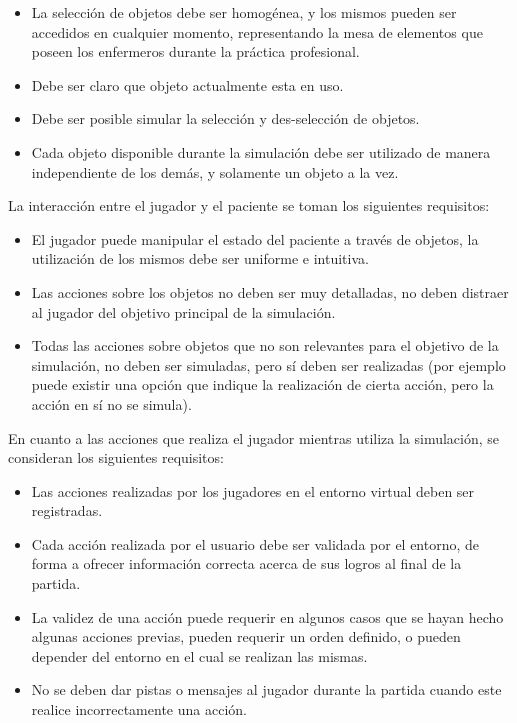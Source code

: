 \begin{itemize}
\item La selección de objetos debe ser homogénea, y los mismos pueden ser
    accedidos en cualquier momento, representando la mesa de elementos que
    poseen los enfermeros durante la práctica profesional.
\item Debe ser claro que objeto actualmente esta en uso.
\item Debe ser posible simular la selección y des-selección de objetos.
\item Cada objeto disponible durante la simulación debe ser utilizado de
    manera independiente de los demás, y solamente un objeto a la vez.
\end{itemize}

La interacción entre el jugador y el paciente se toman los siguientes
requisitos:

\begin{itemize}
\item El jugador puede manipular el estado del paciente a través de objetos, la
    utilización de los mismos debe ser uniforme e intuitiva.
\item Las acciones sobre los objetos no deben ser muy detalladas, no deben
    distraer al jugador del objetivo principal de la simulación.
\item Todas las acciones sobre objetos que no son relevantes para el objetivo de
    la simulación, no deben ser simuladas, pero sí deben ser realizadas (por
    ejemplo puede existir una opción que indique la realización de cierta
    acción, pero la acción en sí no se simula).
\end{itemize}

En cuanto a las acciones que realiza el jugador mientras utiliza la simulación,
se consideran los siguientes requisitos:

\begin{itemize}
\item Las acciones realizadas por los jugadores en el entorno virtual deben ser
    registradas.
\item Cada acción realizada por el usuario debe ser validada por el entorno, de
    forma a ofrecer información correcta acerca de sus logros al final de la
    partida.
\item La validez de una acción puede requerir en algunos casos que se hayan
    hecho algunas acciones previas, pueden requerir un orden definido, o pueden
    depender del entorno en el cual se realizan las mismas.
\item No se deben dar pistas o mensajes al jugador durante la partida cuando
    este realice incorrectamente una acción.
\end{itemize}
